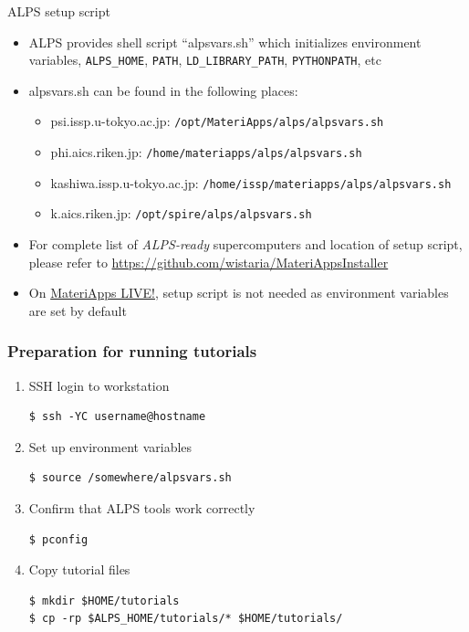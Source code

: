 \begin{frame}[t,fragile]{ALPS setup script}
  \begin{itemize}
  \item ALPS provides shell script ``{\color {red}alpsvars.sh}'' which initializes environment variables, {\tt ALPS\_HOME}, {\tt PATH}, {\tt LD\_LIBRARY\_PATH}, {\tt PYTHONPATH}, etc
  \item alpsvars.sh can be found in the following places:
    \begin{itemize}
    \item psi.issp.u-tokyo.ac.jp:
      {\footnotesize \tt /opt/MateriApps/alps/alpsvars.sh}
    \item phi.aics.riken.jp:
      {\footnotesize \tt /home/materiapps/alps/alpsvars.sh}
    \item kashiwa.issp.u-tokyo.ac.jp:
      {\footnotesize \tt /home/issp/materiapps/alps/alpsvars.sh}
    \item k.aics.riken.jp:
      {\footnotesize \tt /opt/spire/alps/alpsvars.sh}
    \end{itemize}
  \item For complete list of {\color{red} {\em ALPS-ready} supercomputers} and location of setup script, please refer to \url{https://github.com/wistaria/MateriAppsInstaller}
  \item On \href{http://cmsi.github.io/MateriAppsLive/}{MateriApps LIVE!}, setup script is not needed as environment variables are set by default
  \end{itemize}
\end{frame}

\begin{frame}[t,fragile]
  \frametitle{Preparation for running tutorials}
  \begin{enumerate}
  \item SSH login to workstation
\begin{lstlisting}
$ ssh -YC username@hostname
\end{lstlisting}
  \item Set up environment variables
\begin{lstlisting}
$ source /somewhere/alpsvars.sh
\end{lstlisting}
  \item Confirm that ALPS tools work correctly
\begin{lstlisting}
$ pconfig
\end{lstlisting}
  \item Copy tutorial files
\begin{lstlisting}
$ mkdir $HOME/tutorials
$ cp -rp $ALPS_HOME/tutorials/* $HOME/tutorials/
\end{lstlisting}
  \end{enumerate}
\end{frame}

